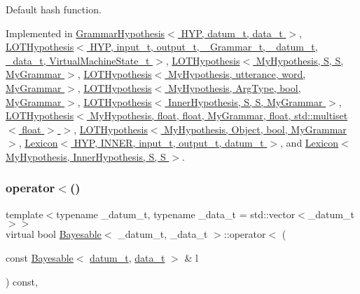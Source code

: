 Default hash function. 



Implemented in \hyperlink{class_grammar_hypothesis_a55297e7d1dac48158efa012445b93137}{Grammar\+Hypothesis$<$ H\+Y\+P, datum\+\_\+t, data\+\_\+t $>$}, \hyperlink{class_l_o_t_hypothesis_a7c33d51f8d81762b1eca7f86b596236a}{L\+O\+T\+Hypothesis$<$ H\+Y\+P, input\+\_\+t, output\+\_\+t, \+\_\+\+Grammar\+\_\+t, \+\_\+datum\+\_\+t, \+\_\+data\+\_\+t, Virtual\+Machine\+State\+\_\+t $>$}, \hyperlink{class_l_o_t_hypothesis_a7c33d51f8d81762b1eca7f86b596236a}{L\+O\+T\+Hypothesis$<$ My\+Hypothesis, S, S, My\+Grammar $>$}, \hyperlink{class_l_o_t_hypothesis_a7c33d51f8d81762b1eca7f86b596236a}{L\+O\+T\+Hypothesis$<$ My\+Hypothesis, utterance, word, My\+Grammar $>$}, \hyperlink{class_l_o_t_hypothesis_a7c33d51f8d81762b1eca7f86b596236a}{L\+O\+T\+Hypothesis$<$ My\+Hypothesis, Arg\+Type, bool, My\+Grammar $>$}, \hyperlink{class_l_o_t_hypothesis_a7c33d51f8d81762b1eca7f86b596236a}{L\+O\+T\+Hypothesis$<$ Inner\+Hypothesis, S, S, My\+Grammar $>$}, \hyperlink{class_l_o_t_hypothesis_a7c33d51f8d81762b1eca7f86b596236a}{L\+O\+T\+Hypothesis$<$ My\+Hypothesis, float, float, My\+Grammar, float, std\+::multiset$<$ float $>$ $>$}, \hyperlink{class_l_o_t_hypothesis_a7c33d51f8d81762b1eca7f86b596236a}{L\+O\+T\+Hypothesis$<$ My\+Hypothesis, Object, bool, My\+Grammar $>$}, \hyperlink{class_lexicon_afbefa510e623ee4a407a1e1e04f42fb2}{Lexicon$<$ H\+Y\+P, I\+N\+N\+E\+R, input\+\_\+t, output\+\_\+t, datum\+\_\+t $>$}, and \hyperlink{class_lexicon_afbefa510e623ee4a407a1e1e04f42fb2}{Lexicon$<$ My\+Hypothesis, Inner\+Hypothesis, S, S $>$}.

\mbox{\label{class_bayesable_ac356e7e5b11c266b8442064186dbe89d}} 
\subsubsection{\texorpdfstring{operator$<$()}{operator<()}}
{\footnotesize\ttfamily template$<$typename \+\_\+datum\+\_\+t, typename \+\_\+data\+\_\+t = std\+::vector$<$\+\_\+datum\+\_\+t$>$$>$ \\
virtual bool \hyperlink{class_bayesable}{Bayesable}$<$ \+\_\+datum\+\_\+t, \+\_\+data\+\_\+t $>$\+::operator$<$ (\begin{DoxyParamCaption}\item[{const \hyperlink{class_bayesable}{Bayesable}$<$ \hyperlink{class_bayesable_a9f1a6c0cd7855550fa10b1a8f13a5867}{datum\+\_\+t}, \hyperlink{class_bayesable_aa2788c4d7718c0a824e1d28c4c98f921}{data\+\_\+t} $>$ \&}]{l }\end{DoxyParamCaption}) const\hspace{0.3cm}{\ttfamily [inline]}, {\ttfamily [virtual]}}


